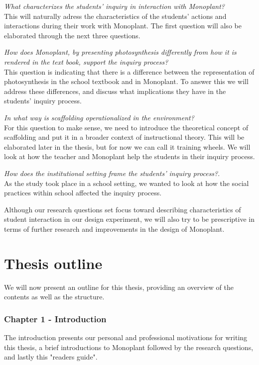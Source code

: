 \begin{noindlist}
\item \emph{What characterizes the students’ inquiry in interaction with Monoplant?}\\
This will naturally adress the characteristics of the students' actions and interactions during their work with Monoplant. The first question will also be elaborated through the next three questions.
\item \emph{How does Monoplant, by presenting photosynthesis differently from how it is rendered in the text book, support the inquiry process?}\\
This question is indicating that there is a difference between the representation of photosynthesis in the school textbook and in Monoplant. To answer this we will address these differences, and discuss what implications they have in the students' inquiry process.
\item \emph{In what way is scaffolding operationalized in the environment?}\\
For this question to make sense, we need to introduce the theoretical concept of scaffolding and put it in a broader context of instructional theory. This will be elaborated later in the thesis, but for now we can call it training wheels. We will look at how the teacher and Monoplant help the students in their inquiry process.
\item \emph{How does the institutional setting frame the students' inquiry process?}.\\
As the study took place in a school setting, we wanted to look at how the social practices within school affected the inquiry process.
\end{noindlist}

Although our research questions set focus toward describing characteristics of student interaction in our design experiment, we will also try to be prescriptive in terms of further research and improvements in the design of Monoplant.

\section{Thesis outline}
We will now present an outline for this thesis, providing an overview of the contents as well as the structure. 

\subsubsection*{Chapter 1 - Introduction}
The introduction presents our personal and professional motivations for writing this thesis, a brief introductions to Monoplant followed by the research questions, and lastly this "readers guide".

